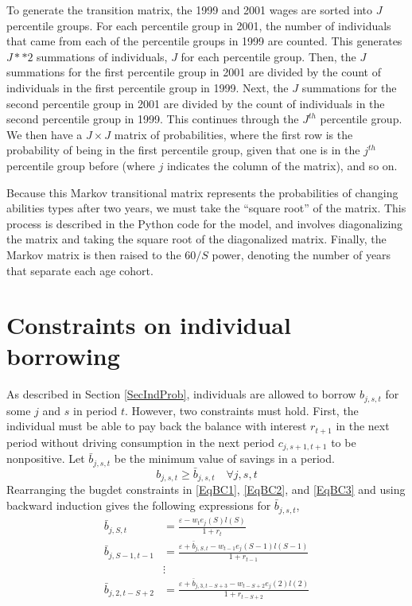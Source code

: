 \documentclass[letterpaper,12pt]{article}
\theoremstyle{definition}
\newcommand\ve{\varepsilon}
\begin{document}
  To generate the transition matrix, the 1999 and 2001 wages are sorted into $J$ percentile groups.  For each percentile group in 2001, the number of individuals that came from each of the percentile groups in 1999 are counted.  This generates $J ** 2$ summations of individuals, $J$ for each percentile group.  Then, the $J$ summations for the first percentile group in 2001 are divided by the count of individuals in the first percentile group in 1999.  Next, the $J$ summations for the second percentile group in 2001 are divided by the count of individuals in the second percentile group in 1999.  This continues through the $J^{th}$ percentile group.  We then have a $J \times J$ matrix of probabilities, where the first row is the probability of being in the first percentile group, given that one is in the $j^{th}$ percentile group before (where $j$ indicates the column of the matrix), and so on.

  Because this Markov transitional matrix represents the probabilities of changing abilities types after two years, we must take the ``square root'' of the matrix.  This process is described in the Python code for the model, and involves diagonalizing the matrix and taking the square root of the diagonalized matrix.  Finally, the Markov matrix is then raised to the $60/S$ power, denoting the number of years that separate each age cohort.



\newpage
\section{Constraints on individual borrowing}\label{AppBorConstr}

  \setcounter{equation}{0}

  As described in Section \ref{SecIndProb}, individuals are allowed to borrow $b_{j,s,t}$ for some $j$ and $s$ in period $t$. However, two constraints must hold. First, the individual must be able to pay back the balance with interest $r_{t+1}$ in the next period without driving consumption in the next period $c_{j,s+1,t+1}$ to be nonpositive. Let $\bar{b}_{j,s,t}$ be the minimum value of savings in a period.
  \begin{equation}\label{EqSavMin}
    b_{j,s,t}\geq\bar{b}_{j,s,t} \quad\forall j,s,t
  \end{equation}
  Rearranging the bugdet constraints in \eqref{EqBC1}, \eqref{EqBC2}, and \eqref{EqBC3} and using backward induction gives the following expressions for $\bar{b}_{j,s,t}$,
  \begin{equation}\label{EqBorConsts}
    \begin{split}
      \bar{b}_{j,S,t} &= \frac{\ve - w_te_j(S)l(S)}{1+r_t}  \\
      \bar{b}_{j,S-1,t-1} &= \frac{\ve + \bar{b}_{j,S,t} - w_{t-1}e_j(S-1)l(S-1)}{1+r_{t-1}} \\
      &\vdots \\
      \bar{b}_{j,2,t-S+2} &= \frac{\ve + \bar{b}_{j,3,t-S+3} - w_{t-S+2}e_j(2)l(2)}{1+r_{t-S+2}}
    \end{split}
  \end{equation}
\end{document}
